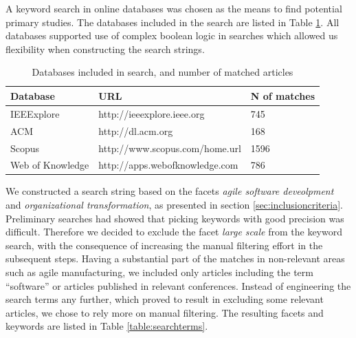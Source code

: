 \documentclass[preprint,authoryear,12pt]{elsarticle}
\begin{document}
A keyword search in online databases was chosen as the means to find potential
primary studies. The databases included in the search are listed in Table
\ref{table:databases}. All databases supported use of complex boolean logic in
searches which allowed us flexibility when constructing the search strings.

\begin{table}
    \begin{tabular}{ p{} l l }
        \toprule
        Database         & URL                         & N of matches   \\
        \midrule
        IEEExplore       & http://ieeexplore.ieee.org      & 745 \\ 
        ACM              & http://dl.acm.org               & 168 \\
        Scopus           & http://www.scopus.com/home.url  & 1596 \\
        Web of Knowledge & http://apps.webofknowledge.com  & 786 \\
        \bottomrule
    \end{tabular}
    \caption{Databases included in search, and number of matched articles}
    \label{table:databases}
\end{table}

We constructed a search string based on the facets \emph{agile software
deveolpment} and \emph{organizational transformation}, as presented in section
\ref{sec:inclusioncriteria}. Preliminary searches had showed that picking
keywords with good precision was difficult. Therefore we decided to exclude the
facet \emph{large scale} from the keyword search, with the consequence of
increasing the manual filtering effort in the subsequent steps.
Having a substantial part of the matches in non-relevant areas such as agile
manufacturing, we included only articles including the term ``software'' or
articles published in relevant conferences. Instead of engineering the search
terms any further, which proved to result in excluding some relevant articles,
we chose to rely more on manual filtering. The resulting facets and keywords are
listed in Table \ref{table:searchterms}.
\end{document}
